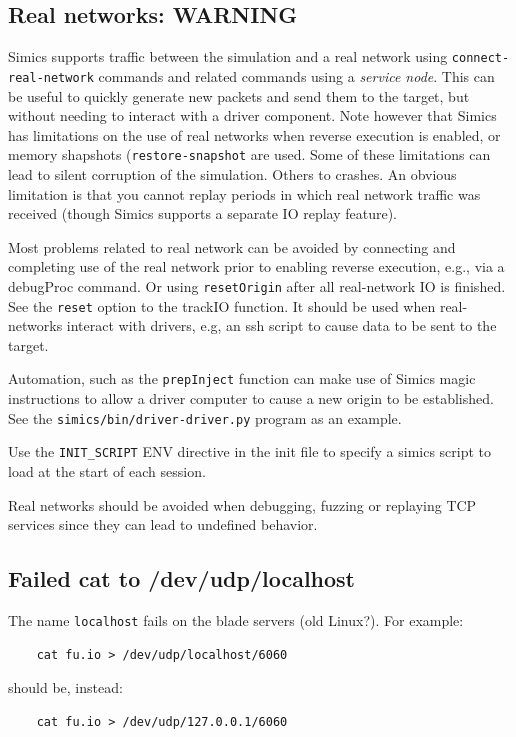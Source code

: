 \documentclass[titlepage]{article}
\begin{document}
\begin{appendices}
\subsection{Real networks: WARNING}
\label{real-networks}
Simics supports traffic between the simulation and a real network using {\tt connect-real-network} commands and related commands using a \textit{service node}.
This can be useful to quickly generate new packets and send them to the target, but without needing to interact with a driver component.
Note however that Simics has limitations on the use of real networks when reverse execution is enabled, or memory shapshots ({\tt restore-snapshot} are used.  
Some of these limitations can lead to silent corruption
of the simulation.  Others to crashes.  An obvious limitation is that you cannot replay periods in which real network traffic was received (though Simics supports a separate IO replay feature).

Most problems related to real network can be avoided by connecting and completing use of the real network prior to enabling reverse execution, e.g., via a debugProc command.  Or using
{\tt resetOrigin} after all real-network IO is finished.  See the {\tt reset} option to the trackIO function.  It should be used when real-networks interact with drivers, e.g, an ssh
script to cause data to be sent to the target.

Automation, such as the {\tt prepInject} function can make use of Simics magic instructions to allow a driver computer to cause a new origin
to be established.  See the {\tt simics/bin/driver-driver.py} program as an example.

Use the {\tt INIT\_SCRIPT} ENV directive in the init file to specify a simics script to load at the start of each session.

Real networks should be avoided when debugging, fuzzing or replaying TCP services since they can lead to undefined behavior.

\subsection{Failed cat to /dev/udp/localhost}
The name {\tt localhost} fails on the blade servers (old Linux?).   For example:
\begin{verbatim}
    cat fu.io > /dev/udp/localhost/6060
\end{verbatim}
\noindent should be, instead:
\begin{verbatim}
    cat fu.io > /dev/udp/127.0.0.1/6060
\end{verbatim}


\end{appendices}
\end{document}
